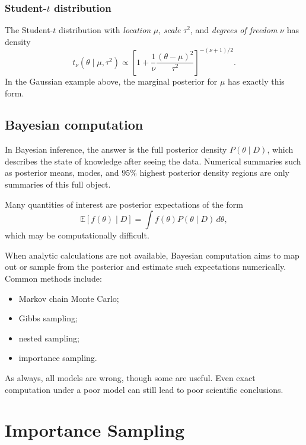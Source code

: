 \documentclass[11pt, titlepage]{article} %
\numberwithin{equation}{section}
\theoremstyle{definition}
\numberwithin{assumption}{section}
\begin{document}
\subsubsection*{Student-$t$ distribution}

The Student-\(t\) distribution with \textit{location} \(\mu\), \textit{scale} \(\tau^2\), and \textit{degrees of freedom} \(\nu\) has density
\begin{equation*}
    t_\nu(\theta\mid \mu,\tau^2)
    \propto
    \left[
    1+\frac{1}{\nu}\frac{(\theta-\mu)^2}{\tau^2}
    \right]^{-(\nu+1)/2}.
\end{equation*}
In the Gaussian example above, the marginal posterior for \(\mu\) has exactly this form.

\subsection{Bayesian computation}

In Bayesian inference, the answer is the full posterior density \(P(\theta\mid D)\), which describes the state of knowledge after seeing the data. Numerical summaries such as posterior means, modes, and \(95\%\) highest posterior density regions are only summaries of this full object.

Many quantities of interest are posterior expectations of the form
\begin{equation*}
    \mathbb{E}[f(\theta)\mid D]
    =
    \int f(\theta)P(\theta\mid D)\,d\theta,
\end{equation*}
which may be computationally difficult.

When analytic calculations are not available, Bayesian computation aims to map out or sample from the posterior and estimate such expectations numerically. Common methods include:
\begin{itemize}
    \item Markov chain Monte Carlo;
    \item Gibbs sampling;
    \item nested sampling;
    \item importance sampling.
\end{itemize}

As always, all models are wrong, though some are useful. Even exact computation under a poor model can still lead to poor scientific conclusions.


\section{Importance Sampling}
\end{document}
